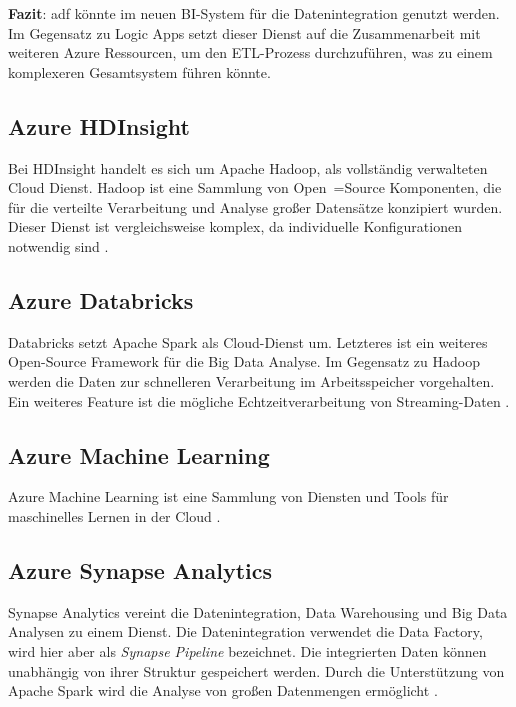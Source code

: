 \textbf{Fazit}: \ac{adf} könnte im neuen BI-System für die Datenintegration genutzt werden. Im Gegensatz zu Logic Apps setzt dieser Dienst auf die Zusammenarbeit mit weiteren Azure Ressourcen, um den ETL-Prozess durchzuführen, was zu einem komplexeren Gesamtsystem führen könnte.

\subsection{Azure HDInsight} \label{sec:grundlagen:azure_dienste:hdInsight}
Bei HDInsight handelt es sich um Apache Hadoop, als vollständig verwalteten Cloud Dienst. Hadoop ist eine Sammlung von Open~=Source Komponenten, die für die verteilte Verarbeitung und Analyse großer Datensätze konzipiert wurden. Dieser Dienst ist vergleichsweise komplex, da individuelle Konfigurationen notwendig sind \cite{klein_iot_2017}.

\subsection{Azure Databricks} \label{sec:grundlagen:azure_dienste:databricks}
Databricks setzt Apache Spark als Cloud-Dienst um. Letzteres ist ein weiteres Open-Source Framework für die Big Data Analyse. Im Gegensatz zu Hadoop werden die Daten zur schnelleren Verarbeitung im Arbeitsspeicher vorgehalten. Ein weiteres Feature ist die mögliche Echtzeitverarbeitung von Streaming-Daten \cite{soh_data_2020}.

\subsection{Azure Machine Learning} \label{sec:grundlagen:azure_dienste:machineLearning}
Azure Machine Learning ist eine Sammlung von Diensten und Tools für maschinelles Lernen in der Cloud \cite{soh_data_2020}.

\subsection{Azure Synapse Analytics} \label{sec:grundlagen:azure_dienste:synapseAnalytics}
Synapse Analytics vereint die Datenintegration, Data Warehousing und Big Data Analysen zu einem Dienst. Die Datenintegration verwendet die Data Factory, wird hier aber als \textit{Synapse Pipeline} bezeichnet. Die integrierten Daten können unabhängig von ihrer Struktur gespeichert werden. Durch die Unterstützung von Apache Spark wird die Analyse von großen Datenmengen ermöglicht \cite{shiyal_beginning_2021}.

